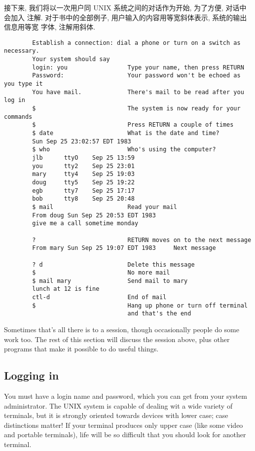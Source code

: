 接下来, 我们将以一次用户同 UNIX 系统之间的对话作为开始, 为了方便, 对话中会加入
注解. 对于书中的全部例子, 用户输入的内容用等宽斜体表示, 系统的输出信息用等宽
字体, 注解用斜体.

\begin{verbatim}
        Establish a connection: dial a phone or turn on a switch as necessary.
        Your system should say
        login: you                 Type your name, then press RETURN
        Password:                  Your password won't be echoed as you type it
        You have mail.             There's mail to be read after you log in
        $                          The system is now ready for your commands
        $                          Press RETURN a couple of times
        $ date                     What is the date and time?
        Sun Sep 25 23:02:57 EDT 1983
        $ who                      Who's using the computer?
        jlb      ttyO    Sep 25 13:59
        you      tty2    Sep 25 23:01
        mary     tty4    Sep 25 19:03
        doug     tty5    Sep 25 19:22
        egb      tty7    Sep 25 17:17
        bob      tty8    Sep 25 20:48
        $ mail                     Read your mail
        From doug Sun Sep 25 20:53 EDT 1983
        give me a call sometime monday

        ?                          RETURN moves on to the next message
        From mary Sun Sep 25 19:07 EDT 1983     Next message

        ? d                        Delete this message
        $                          No more mail
        $ mail mary                Send mail to mary
        lunch at 12 is fine
        ctl-d                      End of mail
        $                          Hang up phone or turn off terminal
                                   and that's the end
\end{verbatim}
Sometimes that's all there is to a session, though occasionally people do some
work too. The rest of this section will discuss the session above, plus other
programs that make it possible to do useful things.


\subsection{Logging in}

You must have a login name and password, which you can get from your system
administrator. The UNIX system is capable of dealing wit a wide variety of
terminals, but it is strongly oriented towards devices with lower case; case
distinctions matter! If your terminal produces only upper case (like some video
and portable terminals), life will be so difficult that you should look for
another terminal.

